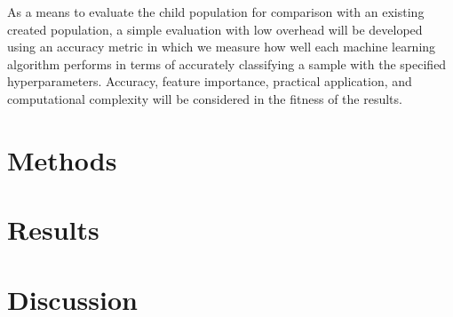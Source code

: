 \documentclass{article}
\begin{document}
As a means to evaluate the child population for comparison with an existing created population, a simple evaluation with low overhead will be developed using an accuracy metric in which we measure how well each machine learning algorithm performs in terms of accurately classifying a sample with the specified hyperparameters. Accuracy, feature importance, practical application, and computational complexity will be considered in the fitness of the results. 

\section{Methods}

\section{Results}

\section{Discussion}



\end{document}
